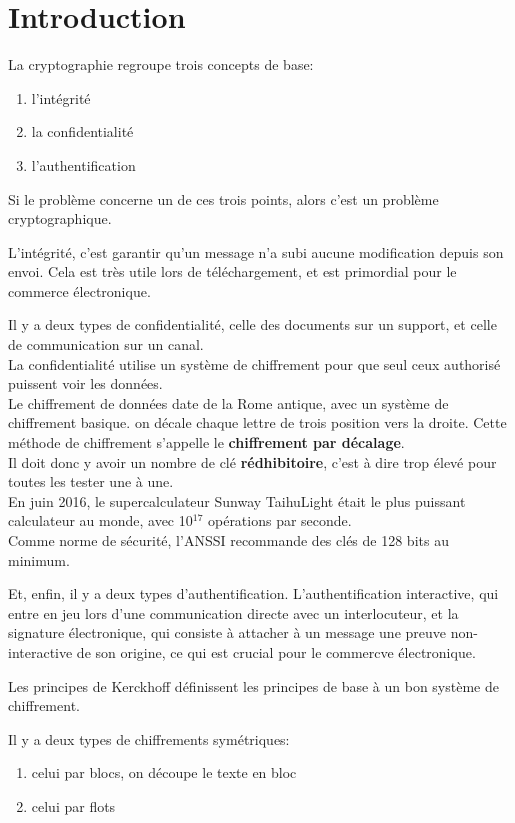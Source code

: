 \section{Introduction}
La cryptographie regroupe trois concepts de base:
\begin{enumerate}
	\item l'intégrité
	\item la confidentialité
	\item l'authentification
\end{enumerate}
Si le problème concerne un de ces trois points, alors c'est un problème cryptographique.

L'intégrité, c'est garantir qu'un message n'a subi aucune modification depuis son envoi. Cela est très utile lors de
téléchargement, et est primordial pour le commerce électronique.

Il y a deux types de confidentialité, celle des documents sur un support, et celle de communication sur un canal.\\
La confidentialité utilise un système de chiffrement pour que seul ceux authorisé puissent voir les données.\\
Le chiffrement de données date de la Rome antique, avec un système de chiffrement basique. on décale chaque lettre de
trois position vers la droite. Cette méthode de chiffrement s'appelle le \textbf{chiffrement par décalage}.\\
Il doit donc y avoir un nombre de clé \textbf{rédhibitoire}, c'est à dire trop élevé pour toutes les tester une à une.\\
En juin 2016, le supercalculateur Sunway TaihuLight était le plus puissant calculateur au monde, avec 10$^{17}$
opérations par seconde.\\
Comme norme de sécurité, l'ANSSI recommande des clés de 128 bits au minimum.

Et, enfin, il y a deux types d'authentification. L'authentification interactive, qui entre en jeu lors d'une
communication directe avec un interlocuteur, et la signature électronique, qui consiste à attacher à un message une
preuve non-interactive de son origine, ce qui est crucial pour le commercve électronique.

Les principes de Kerckhoff définissent les principes de base à un bon système de chiffrement.

Il y a deux types de chiffrements symétriques:
\begin{enumerate}
	\item celui par blocs, on découpe le texte en bloc
	\item celui par flots
\end{enumerate}

